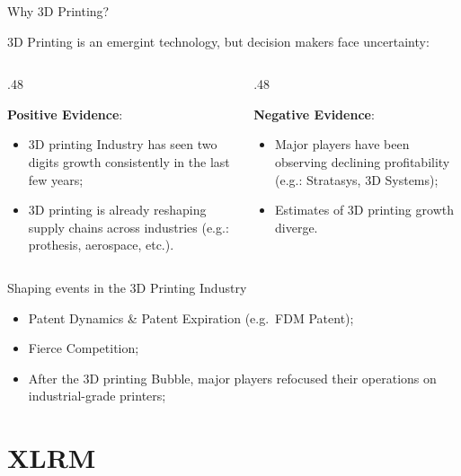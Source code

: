 \documentclass[12pt,ignorenonframetext,]{beamer}
\providecommand{\tightlist}{%
  \setlength{\itemsep}{0pt}\setlength{\parskip}{0pt}}
\def\begincols{\begin{columns}}
\def\begincol{\begin{column}}
\def\endcol{\end{column}}
\def\endcols{\end{columns}}
\begin{document}
\begin{frame}{Why 3D Printing?}

3D Printing is an emergint technology, but decision makers face
uncertainty:

\begincols
 \begincol{.48\textwidth}

\textbf{Positive Evidence}:

\begin{itemize}
\tightlist
\item
  3D printing Industry has seen two digits growth consistently in the
  last few years;
\item
  3D printing is already reshaping supply chains across industries
  (e.g.: prothesis, aerospace, etc.).
\end{itemize}

\endcol
\begincol{.48\textwidth}

\textbf{Negative Evidence}:

\begin{itemize}
\tightlist
\item
  Major players have been observing declining profitability (e.g.:
  Stratasys, 3D Systems);
\item
  Estimates of 3D printing growth diverge.
\end{itemize}

\endcol
\endcols

\end{frame}

\begin{frame}{Shaping events in the 3D Printing Industry}

\begin{itemize}
\tightlist
\item
  Patent Dynamics \& Patent Expiration (e.g.~FDM Patent);
\item
  Fierce Competition;
\item
  After the 3D printing Bubble, major players refocused their operations
  on industrial-grade printers;
\end{itemize}

\end{frame}

\section{XLRM}\label{xlrm}
\end{document}
